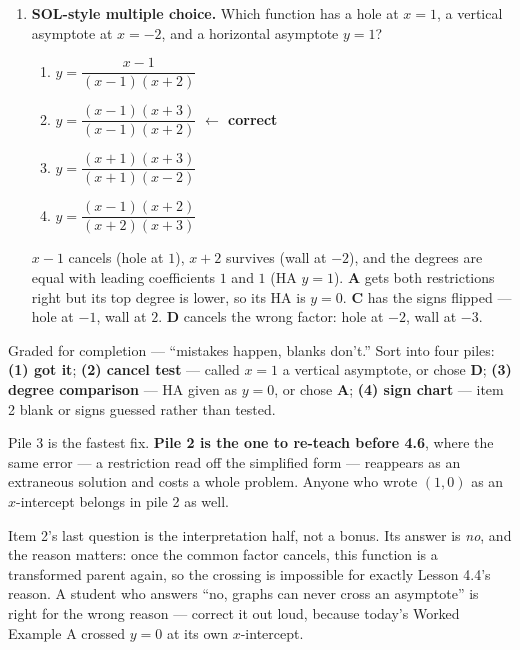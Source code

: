 \documentclass[10pt]{article}
\begin{document}
\begin{enumerate}[leftmargin=1.8em, itemsep=8pt]
  \item \textbf{SOL-style multiple choice.} Which function has a hole at $x=1$, a vertical asymptote at
        $x=-2$, and a horizontal asymptote $y=1$?
        \begin{enumerate}[label=\Alph*., leftmargin=1.9em, itemsep=1pt]
          \item $y=\dfrac{x-1}{(x-1)(x+2)}$
          \item $y=\dfrac{(x-1)(x+3)}{(x-1)(x+2)}$
                \quad \textcolor{keyred}{\textbf{$\leftarrow$ correct}}
          \item $y=\dfrac{(x+1)(x+3)}{(x+1)(x-2)}$
          \item $y=\dfrac{(x-1)(x+2)}{(x+2)(x+3)}$
        \end{enumerate}
        \vspace{2pt}
        {\small $x-1$ cancels (hole at $1$), $x+2$ survives (wall at $-2$), and the degrees are equal
        with leading coefficients $1$ and $1$ (HA $y=1$). \textbf{A} gets both restrictions right but
        its top degree is lower, so its HA is $y=0$. \textbf{C} has the signs flipped --- hole at $-1$,
        wall at $2$. \textbf{D} cancels the wrong factor: hole at $-2$, wall at $-3$.}
\end{enumerate}

\begin{teachernote}
Graded for completion --- ``mistakes happen, blanks don't.'' Sort into four piles: \textbf{(1) got it};
\textbf{(2) cancel test} --- called $x=1$ a vertical asymptote, or chose \textbf{D}; \textbf{(3) degree
comparison} --- HA given as $y=0$, or chose \textbf{A}; \textbf{(4) sign chart} --- item 2 blank or
signs guessed rather than tested.

\vspace{3pt}
Pile 3 is the fastest fix. \textbf{Pile 2 is the one to re-teach before 4.6}, where the same error --- a
restriction read off the simplified form --- reappears as an extraneous solution and costs a whole
problem. Anyone who wrote $(1,0)$ as an $x$-intercept belongs in pile 2 as well.

\vspace{3pt}
Item 2's last question is the interpretation half, not a bonus. Its answer is \emph{no}, and the reason
matters: once the common factor cancels, this function is a transformed parent again, so the crossing
is impossible for exactly Lesson 4.4's reason. A student who answers ``no, graphs can never cross an
asymptote'' is right for the wrong reason --- correct it out loud, because today's Worked Example A
crossed $y=0$ at its own $x$-intercept.
\end{teachernote}
\end{document}

